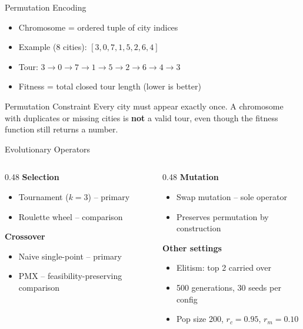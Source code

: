 \documentclass[10pt,aspectratio=169]{beamer}
\begin{document}
\begin{frame}{Permutation Encoding}
\begin{itemize}
    \item Chromosome = ordered tuple of city indices
    \item Example (8 cities): $[3,0,7,1,5,2,6,4]$
    \item Tour: $3 \to 0 \to 7 \to 1 \to 5 \to 2 \to 6 \to 4 \to 3$
    \item Fitness = total closed tour length (lower is better)
\end{itemize}

\medskip

\begin{alertblock}{Permutation Constraint}
Every city must appear exactly once. A chromosome with duplicates or
missing cities is \textbf{not} a valid tour, even though the fitness
function still returns a number.
\end{alertblock}
\end{frame}

\begin{frame}{Evolutionary Operators}
\begin{columns}
\begin{column}{0.48\textwidth}
\textbf{Selection}
\begin{itemize}
    \item Tournament ($k{=}3$) -- primary
    \item Roulette wheel -- comparison
\end{itemize}

\medskip

\textbf{Crossover}
\begin{itemize}
    \item Naive single-point -- primary
    \item PMX -- feasibility-preserving comparison
\end{itemize}
\end{column}
\begin{column}{0.48\textwidth}
\textbf{Mutation}
\begin{itemize}
    \item Swap mutation -- sole operator
    \item Preserves permutation by construction
\end{itemize}

\medskip

\textbf{Other settings}
\begin{itemize}
    \item Elitism: top 2 carried over
    \item 500 generations, 30 seeds per config
    \item Pop size 200, $r_c{=}0.95$, $r_m{=}0.10$
\end{itemize}
\end{column}
\end{columns}
\end{frame}
\end{document}
